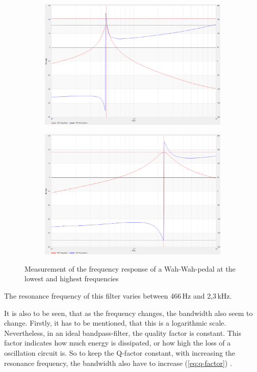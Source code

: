 \begin{figure}[!h]
    \centering
    \begin{subfigure}[c]{0.45\textwidth}
        \centering
        \includegraphics[width=\textwidth]{img/wahwah-1.png}
    \end{subfigure}
    \begin{subfigure}[c]{0.45\textwidth}
        \centering
        \includegraphics[width=\textwidth]{img/wahwah-2.png}
    \end{subfigure}
    \caption{Measurement of the frequency response of a Wah-Wah-pedal at the lowest and highest frequencies}
    \label{fig:wahwah-filter}
\end{figure}

The resonance frequency of this filter varies between 466\,Hz and 2,3\,kHz.

It is also to be seen, that as the frequency changes, the bandwidth also seem to change. Firstly, it has to be mentioned,
that this is a logarithmic scale. Nevertheless, in an ideal bandpass-filter, the quality factor is constant. This factor indicates
how much energy is dissipated, or how high the loss of a oscillation circuit is. So to keep the Q-factor constant, with
increasing the resonance frequency, the bandwidth also have to increase (\autoref{eq:q-factor}) \cite{taschenbuch_et}.

